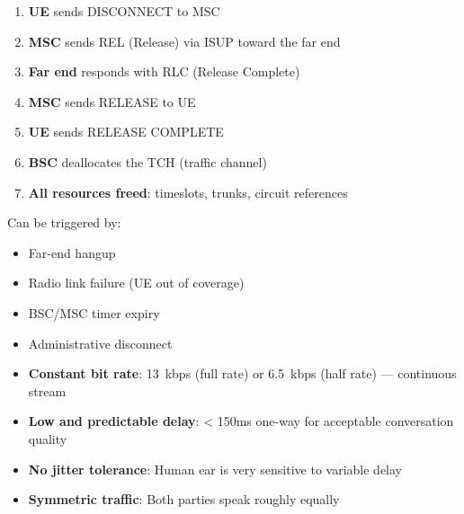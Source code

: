 

\CNchained{}

\begin{enumerate}
\def\labelenumi{\arabic{enumi}.}
\tightlist
\item
  \textbf{UE} sends DISCONNECT to MSC
\item
  \textbf{MSC} sends REL (Release) via ISUP toward the far end
\item
  \textbf{Far end} responds with RLC (Release Complete)
\item
  \textbf{MSC} sends RELEASE to UE
\item
  \textbf{UE} sends RELEASE COMPLETE
\item
  \textbf{BSC} deallocates the TCH (traffic channel)
\item
  \textbf{All resources freed}: timeslots, trunks, circuit references
\end{enumerate}


Can be triggered by:

\begin{itemize}
\tightlist
\item
  Far-end hangup
\item
  Radio link failure (UE out of coverage)
\item
  BSC/\allowbreak{}MSC timer expiry
\item
  Administrative disconnect
\end{itemize}






\CNchained{}

\CNchained{}

\begin{itemize}
\tightlist
\item
  \textbf{Constant bit rate}: 13~kbps (full rate) or 6.5~kbps (half rate) — continuous stream
\item
  \textbf{Low and predictable delay}: \textless{} 150ms one-way for acceptable conversation quality
\item
  \textbf{No jitter tolerance}: Human ear is very sensitive to variable delay
\item
  \textbf{Symmetric traffic}: Both parties speak roughly equally
\end{itemize}

